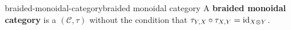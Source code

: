 \begin{topic}{braided-monoidal-category}{braided monoidal category}
    A \textbf{braided monoidal category} is a  $(\mathcal{C}, \tau)$ without the condition that $\tau_{Y, X} \circ \tau_{X, Y} = \text{id}_{X \otimes Y}$.
\end{topic}

